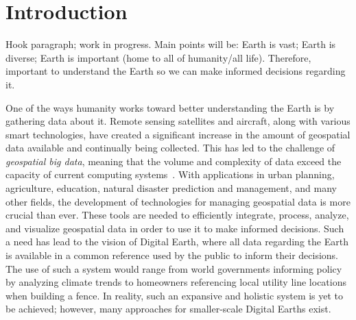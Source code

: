 \chapter{Introduction} \label{chap:introduction}
Hook paragraph; work in progress.
Main points will be:
Earth is vast;
Earth is diverse;
Earth is important (home to all of humanity/all life).
Therefore, important to understand the Earth so we can make informed decisions regarding it.



One of the ways humanity works toward better understanding the Earth is by gathering data about it.
Remote sensing satellites and aircraft, along with various smart technologies, have created a significant increase in the amount of geospatial data available and continually being collected.
This has led to the challenge of \textit{geospatial big data}, meaning that the volume and complexity of data exceed the capacity of current computing systems~\cite{lee2015geospatial}.
With applications in urban planning, agriculture, education, natural disaster prediction and management, and many other fields, the development of technologies for managing geospatial data is more crucial than ever.
These tools are needed to efficiently integrate, process, analyze, and visualize geospatial data in order to use it to make informed decisions.
Such a need has lead to the vision of Digital Earth, where all data regarding the Earth is available in a common reference used by the public to inform their decisions.
The use of such a system would range from world governments informing policy by analyzing climate trends to homeowners referencing local utility line locations when building a fence.
In reality, such an expansive and holistic system is yet to be achieved; however, many approaches for smaller-scale Digital Earths exist.


